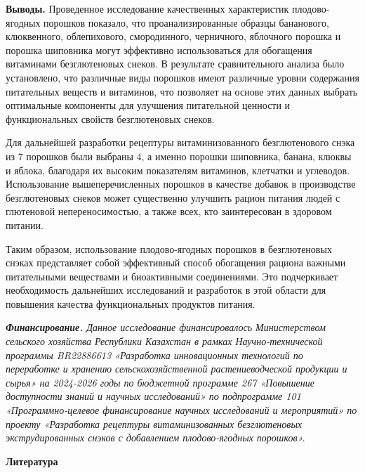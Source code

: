 \begin{multicols}{2}
{\bfseries Выводы.} Проведенное исследование качественных характеристик
плодово-ягодных порошков показало, что проанализированные образцы
бананового, клюквенного, облепихового, смородинного, черничного,
яблочного порошка и порошка шиповника могут эффективно использоваться
для обогащения витаминами безглютеновых снеков. В результате
сравнительного анализа было установлено, что различные виды порошков
имеют различные уровни содержания питательных веществ и витаминов, что
позволяет на основе этих данных выбрать оптимальные компоненты для
улучшения питательной ценности и функциональных свойств безглютеновых
снеков.

Для дальнейшей разработки рецептуры витаминизованного безглютенового
снэка из 7 порошков были выбраны 4, а именно порошки шиповника, банана,
клюквы и яблока, благодаря их высоким показателям витаминов, клетчатки и
углеводов. Использование вышеперечисленных порошков в качестве добавок в
производстве безглютеновых снеков может существенно улучшить рацион
питания людей с глютеновой непереносимостью, а также всех, кто
заинтересован в здоровом питании.

Таким образом, использование плодово-ягодных порошков в безглютеновых
снэках представляет собой эффективный способ обогащения рациона важными
питательными веществами и биоактивными соединениями. Это подчеркивает
необходимость дальнейших исследований и разработок в этой области для
повышения качества функциональных продуктов питания.

\emph{{\bfseries Финансирование.} Данное исследование финансировалось
Министерством сельского хозяйства Республики Казахстан в рамках
Научно-технической программы BR22886613 «Разработка инновационных
технологий по переработке и хранению сельскохозяйственной
растениеводческой продукции и сырья» на 2024-2026 годы по бюджетной
программе 267 «Повышение доступности знаний и научных исследований» по
подпрограмме 101 «Программно-целевое финансирование научных исследований
и мероприятий» по проекту «Разработка рецептуры витаминизованных
безглютеновых экструдированных снэков с добавлением плодово-ягодных
порошков».}
\end{multicols}

\begin{center}
{\bfseries Литература}
\end{center}

